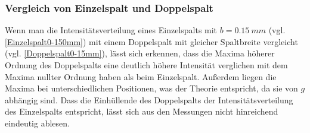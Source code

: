 \documentclass[
	a4paper,
	12pt,
	pagesize,
	ngerman
]{scrartcl}
\begin{document}
	\subsubsection{Vergleich von Einzelspalt und Doppelspalt}
	Wenn man die Intensitätsverteilung eines Einzelspalts mit $b=\SI{0,15}{mm}$ (vgl. \cref{Einzelspalt0-150mm}) mit einem Doppelspalt mit gleicher Spaltbreite vergleicht (vgl. \cref{Doppelspalt0-15mm}), lässt sich erkennen, dass die Maxima höherer Ordnung des Doppelspalts eine deutlich höhere Intensität verglichen mit dem Maxima nullter Ordnung haben als beim Einzelspalt.
	Außerdem liegen die Maxima bei unterschiedlichen Positionen, was der Theorie entspricht, da sie von $g$ abhängig sind.
	Dass die Einhüllende des Doppelspalts der Intensitätsverteilung des Einzelspalts entspricht, lässt sich aus den Messungen nicht hinreichend eindeutig ablesen.
	
\end{document}
